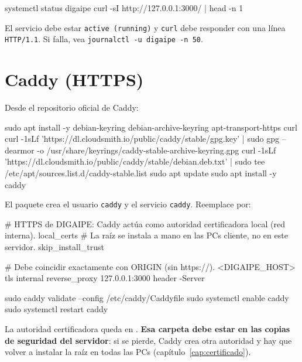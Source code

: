 \begin{comprobar}
	\begin{codigo}
systemctl status digaipe
curl -sI http://127.0.0.1:3000/ | head -n 1
	\end{codigo}
	El servicio debe estar \texttt{active (running)} y \texttt{curl} debe responder con una línea
	\texttt{HTTP/1.1}. Si falla, vea \texttt{journalctl -u digaipe -n 50}.
\end{comprobar}

\section{Caddy (HTTPS)}

Desde el repositorio oficial de Caddy:

\begin{codigo}
sudo apt install -y debian-keyring debian-archive-keyring apt-transport-https curl
curl -1sLf 'https://dl.cloudsmith.io/public/caddy/stable/gpg.key' | sudo gpg --dearmor -o /usr/share/keyrings/caddy-stable-archive-keyring.gpg
curl -1sLf 'https://dl.cloudsmith.io/public/caddy/stable/debian.deb.txt' | sudo tee /etc/apt/sources.list.d/caddy-stable.list
sudo apt update
sudo apt install -y caddy
\end{codigo}

El paquete crea el usuario \texttt{caddy} y el servicio \texttt{caddy}. Reemplace
 por:

\begin{codigo}[label={/etc/caddy/Caddyfile}]
# HTTPS de DIGAIPE: Caddy actúa como autoridad certificadora local (red interna).
{
	local_certs
	# La raíz se instala a mano en las PCs cliente, no en este servidor.
	skip_install_trust
}

# Debe coincidir exactamente con ORIGIN (sin https://).
<DIGAIPE_HOST> {
	tls internal
	reverse_proxy 127.0.0.1:3000
	header -Server
}
\end{codigo}

\begin{codigo}
sudo caddy validate --config /etc/caddy/Caddyfile
sudo systemctl enable caddy
sudo systemctl restart caddy
\end{codigo}

La autoridad certificadora queda en
. \textbf{Esa carpeta debe
estar en las copias de seguridad del servidor}: si se pierde, Caddy crea otra autoridad y hay
que volver a instalar la raíz en todas las PCs (capítulo~\ref{cap:certificado}).

